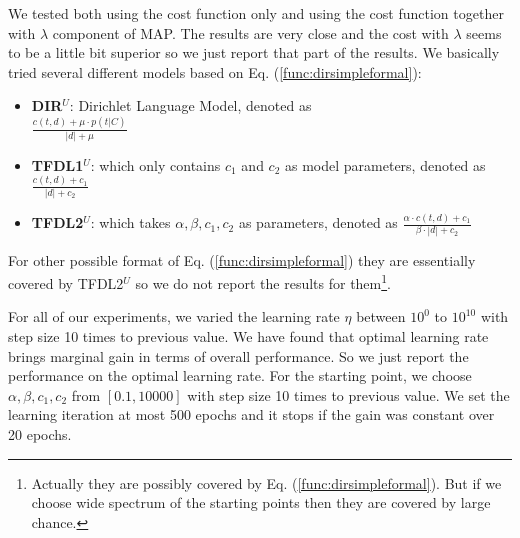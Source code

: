 We tested both using the cost function only and using the cost function 
together with $\lambda$ component of MAP. The results are very close 
and the cost with $\lambda$ seems to be a little bit superior so we 
just report that part of the results.
We basically tried several different models based on Eq. (\ref{func:dirsimpleformal}):
\begin{itemize}
\item \textbf{DIR$^U$}: Dirichlet Language Model, denoted as \\ $\frac{c(t,d)+\mu\cdot p(t|C)}{|d|+\mu}$ 
\item \textbf{TFDL1$^U$}: which only contains $c_1$ and $c_2$ as model parameters, denoted as $\frac{c(t,d)+c_1}{|d|+c_2}$
\item \textbf{TFDL2$^U$}: which takes $\alpha,\beta,c_1,c_2$ as parameters, denoted as $\frac{\alpha \cdot c(t,d)+c_1}{\beta \cdot |d|+c_2}$
\end{itemize}
For other possible format of Eq. (\ref{func:dirsimpleformal}) they are 
essentially covered by TFDL2$^U$ so we do not report the results for them\footnote{Actually they are possibly covered by 
Eq. (\ref{func:dirsimpleformal}). But if we choose wide spectrum of 
the starting points then they are covered by large chance.}.




For all of our experiments, we varied the learning rate $\eta$ between 
$10^0$ to $10^{10}$ with step size 10 times to previous value. 
We have found that optimal learning rate brings marginal gain in terms 
of overall performance. So we just report the 
performance on the optimal learning rate. For the starting 
point, we choose $\alpha, \beta, c_1, c_2$ from $[0.1, 10000]$ with 
step size 10 times to previous value. 
We set the learning iteration at most 500 epochs and it stops 
if the gain was constant over 20 epochs.


